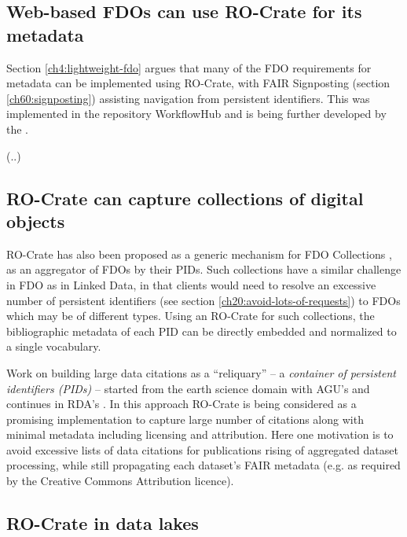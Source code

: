 \subsection{Web-based FDOs can use RO-Crate for its metadata}

Section \vref{ch4:lightweight-fdo} argues that many of the FDO requirements \cite{fdo-RequirementSpec} for metadata can be implemented using RO-Crate, with FAIR Signposting (section \vref{ch60:signposting}) assisting navigation from persistent identifiers. This was implemented in the repository WorkflowHub \cite{wittenburgFAIRDigitalObject2022b} and is being further developed by the  \cite{10.5281/zenodo.7152762}.

(..)

\subsection{RO-Crate can capture collections of digital objects}

RO-Crate has also been proposed as a generic mechanism for FDO Collections \cite{fdo-collections}, as an aggregator of FDOs by their PIDs. Such collections have a similar challenge in FDO as in Linked Data, in that clients would need to resolve an excessive number of persistent identifiers (see section \vref{ch20:avoid-lots-of-requests}) to FDOs which may be of different types. Using an RO-Crate for such collections, the bibliographic metadata of each PID can be directly embedded and normalized to a single vocabulary. 
 
Work on building large data citations as a ``reliquary'' -- a \emph{container of persistent identifiers (PIDs)} \cite{Buck 2022} -- started from the earth science domain with AGU's  and continues in RDA's . In this approach RO-Crate is being considered as a promising implementation to capture large number of citations along with minimal metadata including licensing and attribution. Here one motivation is to avoid excessive lists of data citations for publications rising of aggregated dataset processing, while still propagating each dataset's FAIR metadata (e.g. as required by the Creative Commons Attribution licence).


\subsection{RO-Crate in data lakes}

